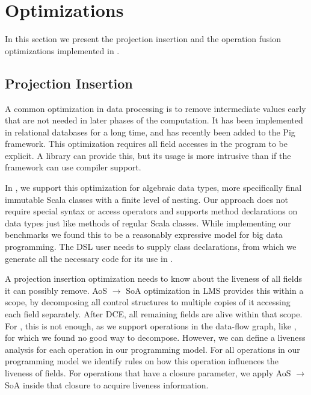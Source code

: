 \section{Optimizations}
\label{sec:optimizations}
In this section we present the projection insertion and the operation fusion optimizations implemented in \tool.
\subsection{Projection Insertion}
\label{sec:field-reduction}
\newcommand{\aos}{AoS $\rightarrow$ SoA }

A common optimization in data processing is to remove intermediate values early that are not needed in later phases of the computation. It has been implemented in relational databases for a long time, and has recently been added to the Pig framework. This optimization requires all field accesses in the program to be explicit. A library can provide this, but its usage is more intrusive than if the framework can use compiler support. 

In \tool, we support this optimization for algebraic data types, more specifically final immutable Scala classes with a finite level of nesting. Our approach does not require special syntax or access operators and supports method declarations on data types just like methods of regular Scala classes. While implementing our benchmarks we found this to be a reasonably expressive model for big data programming. The DSL user needs to supply class declarations, from which we generate all the necessary code for its use in \tool. 

A projection insertion optimization needs to know about the liveness of all fields it can possibly remove. \aos optimization in LMS provides this within a scope, by decomposing all control structures to multiple copies of it accessing each field separately. After DCE, all remaining fields are alive within that scope. For \tool, this is not enough, as we support operations in the data-flow graph, like , for which we found no good way to decompose. However, we can define a liveness analysis for each operation in our programming model. For all operations in our programming model we identify rules on how this operation influences the liveness of fields. For operations that have a closure parameter, we apply \aos inside that closure to acquire liveness information.

